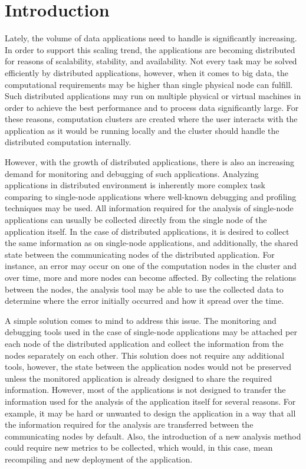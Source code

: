\chapter{Introduction}
Lately, the volume of data applications need to handle is significantly increasing. In order to support this scaling trend, the applications are becoming distributed for reasons of scalability, stability, and availability. Not every task may be solved efficiently by distributed applications, however, when it comes to big data, the computational requirements may be higher than single physical node can fulfill. Such distributed applications may run on multiple physical or virtual machines in order to achieve the best performance and to process data significantly large. For these reasons, computation clusters are created where the user interacts with the application as it would be running locally and the cluster should handle the distributed computation internally.

However, with the growth of distributed applications, there is also an increasing demand for monitoring and debugging of such applications. Analyzing applications in distributed environment is inherently more complex task comparing to single-node applications where well-known debugging and profiling techniques may be used. All information required for the analysis of single-node applications can usually be collected directly from the single node of the application itself. In the case of distributed applications, it is desired to collect the same information as on single-node applications, and additionally, the shared state between the communicating nodes of the distributed application. For instance, an error may occur on one of the computation nodes in the cluster and over time, more and more nodes can become affected. By collecting the relations between the nodes, the analysis tool may be able to use the collected data to determine where the error initially occurred and how it spread over the time. 

A simple solution comes to mind to address this issue. The monitoring and debugging tools used in the case of single-node applications may be attached per each node of the distributed application and collect the information from the nodes separately on each other. This solution does not require any additional tools, however, the state between the application nodes would not be preserved unless the monitored application is already designed to share the required information. However, most of the applications is not designed to transfer the information used for the analysis of the application itself for several reasons. For example, it may be hard or unwanted to design the application in a way that all the information required for the analysis are transferred between the communicating nodes by default. Also, the introduction of a new analysis method could require new metrics to be collected, which would, in this case, mean recompiling and new deployment of the application.

